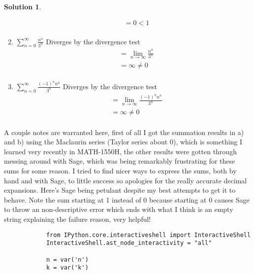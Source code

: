 \documentclass[10pt]{article}
\makeatletter
\theoremstyle{definition}
\newtheorem{soln}{Solution}
\newcommand{\boxspacing}{\kern\kvtcb@left@rule\kern\kvtcb@boxsep}
\newcommand{\prompt}[4]{
    \ttfamily\llap{{\color{#2}[#3]:\hspace{3pt}#4}}\vspace{-\baselineskip}
}
\makeatother
\begin{document}
\begin{soln}
\begin{enumerate}[label=(\alph*)]
\begin{align*}
                      & = 0 < 1                                                                              \\
                \end{align*}
          \item $\displaystyle \sum_{n = 0}^{\infty} \frac{n^n}{3^n}$ Diverges by the divergence test
                \begin{align*}
                      & = \lim_{n \to \infty} \frac{n^n}{3^n} \\
                      & = \infty \neq 0                       \\
                \end{align*}
          \item $\displaystyle \sum_{n = 0}^{\infty} \frac{(-1)^nn^n}{3^n}$ Diverges by the divergence test
                \begin{align*}
                      & = \lim_{n \to \infty} \frac{(-1)^nn^n}{3^n} \\
                      & = \infty \neq 0                             \\
                \end{align*}
     \end{enumerate}
     A couple notes are warranted here, first of all I got the summation results in a) and b) using the Maclaurin series (Taylor series about 0), which is something I learned very recently in MATH-1550H,
     the other results were gotten through messing around with Sage, which was being remarkably frustrating for these sums for some reason. I tried to find nicer ways to express the sums, both by hand and with
     Sage, to little success so apologies for the really accurate decimal expansions. Here's Sage being petulant despite my best attempts to get it to behave. Note the sum starting at 1 instead of 0
     because starting at 0 causes Sage to throw an non-descriptive error which ends with what I think is an empty string explaining the failure reason, very helpful!

     \begin{tcolorbox}[breakable, size=fbox, boxrule=1pt, pad at break*=1mm,colback=cellbackground, colframe=cellborder]
          \prompt{In}{incolor}{1}{\boxspacing}
          \begin{verbatim}
            from IPython.core.interactiveshell import InteractiveShell
            InteractiveShell.ast_node_interactivity = "all"
            
            n = var('n')
            k = var('k')
            

\end{verbatim}
\end{tcolorbox}
\end{soln}
\end{document}
